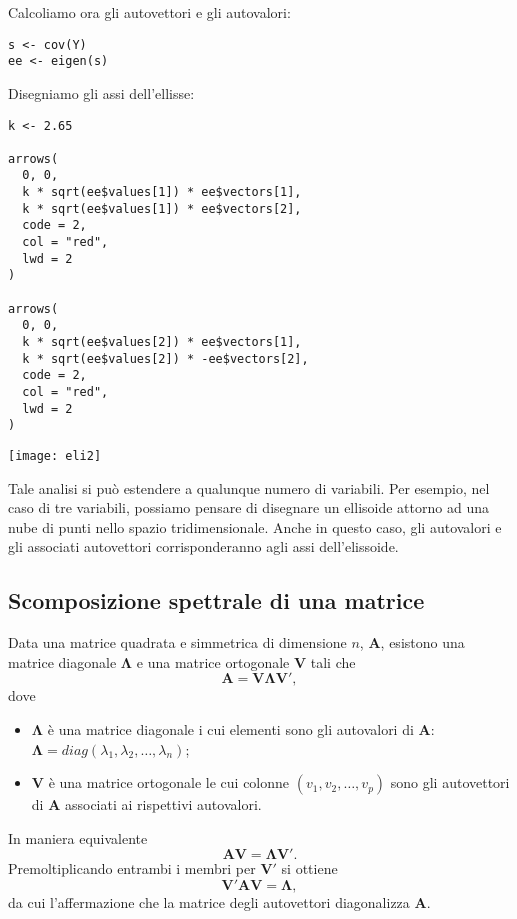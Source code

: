 Calcoliamo ora gli autovettori e gli autovalori:
\begin{lstlisting}
s <- cov(Y)
ee <- eigen(s)
\end{lstlisting}
Disegniamo gli assi dell'ellisse:
\begin{lstlisting}
k <- 2.65

arrows(
  0, 0, 
  k * sqrt(ee$values[1]) * ee$vectors[1],
  k * sqrt(ee$values[1]) * ee$vectors[2],
  code = 2, 
  col = "red", 
  lwd = 2
)

arrows(
  0, 0, 
  k * sqrt(ee$values[2]) * ee$vectors[1],
  k * sqrt(ee$values[2]) * -ee$vectors[2],
  code = 2, 
  col = "red", 
  lwd = 2
)
\end{lstlisting}

\begin{center}
  \texttt{[image: eli2]}
\end{center}

Tale analisi si può estendere a qualunque numero di variabili.
Per esempio, nel caso di tre variabili, possiamo pensare di
disegnare un ellisoide attorno ad una nube di punti nello spazio
tridimensionale. Anche in questo caso, gli autovalori e gli
associati autovettori  corrisponderanno agli assi dell'elissoide.

\subsection{Scomposizione spettrale di una matrice}

 Data una matrice  quadrata e simmetrica  di dimensione $n$,
    $\boldsymbol{A}$,  esistono una matrice diagonale $\boldsymbol{\Lambda}$ e una matrice
    ortogonale $\boldsymbol{V}$ tali che
    \[
     \boldsymbol{A} =\boldsymbol{V} \boldsymbol{\Lambda} \boldsymbol{V}',
    \]
dove 
\begin{itemize}
    \item $\boldsymbol{\Lambda}$ {\`e} una matrice diagonale i cui elementi sono gli autovalori
    di $\boldsymbol{A}$: $\boldsymbol{\Lambda} = diag(\lambda_1, \lambda_2,
    \dots, \lambda_n)$;
    \item $\boldsymbol{V}$ {\`e} una matrice ortogonale le cui colonne $(v_1, v_2, \dots, v_p)$ sono gli autovettori
    di $\boldsymbol{A}$ associati ai rispettivi autovalori.
\end{itemize}
 In maniera equivalente
    \[
     \boldsymbol{A} \boldsymbol{V} =  \boldsymbol{\Lambda} \boldsymbol{V}'.
    \]
 Premoltiplicando entrambi i membri per $\boldsymbol{V}'$ si
ottiene
$$
\boldsymbol{V}'\boldsymbol{A} \boldsymbol{V} =
\boldsymbol{\Lambda},
$$
da cui l'affermazione che la matrice degli autovettori
diagonalizza $\boldsymbol{A}$.

